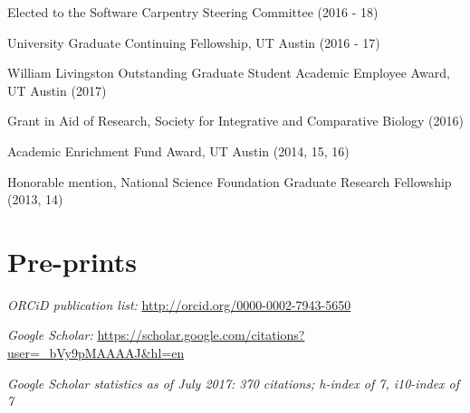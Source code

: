 \documentclass[margin,line]{resume}
\begin{document}
\begin{resume}
\begin{description}[leftmargin=0pt]  
\setlength{\itemsep}{1pt} 
\item[] Elected to the Software Carpentry Steering Committee (2016 - 18)
\item[] University Graduate Continuing Fellowship, UT Austin (2016 - 17)
\item[] William Livingston Outstanding Graduate Student Academic Employee Award, UT Austin (2017)
\item[] Grant in Aid of Research,  Society for Integrative and Comparative Biology (2016)
\item[] Academic Enrichment Fund Award, UT Austin (2014, 15, 16)
\item[] Honorable mention, National Science Foundation Graduate Research Fellowship (2013, 14)
\end{description}





 \section{\mysidestyle Pre-prints}
    
\begin{description}[leftmargin=0pt]  
\setlength{\itemsep}{2pt} 
\item[] {\em ORCiD publication list:} \url{http://orcid.org/0000-0002-7943-5650}
\item[] {\em Google Scholar:} \url{https://scholar.google.com/citations?user=_bVy9pMAAAAJ&hl=en}
\item[] {\em Google Scholar statistics as of July 2017: 370 citations; h-index of 7, i10-index of 7}
\item[]
\end{description}


\end{resume}
\end{document}
